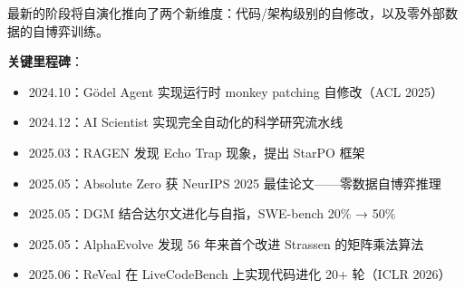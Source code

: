 最新的阶段将自演化推向了两个新维度：代码/架构级别的自修改，以及零外部数据的自博弈训练。

\textbf{关键里程碑}：
\begin{itemize}
\item 2024.10：Gödel Agent 实现运行时 monkey patching 自修改（ACL 2025）
\item 2024.12：AI Scientist 实现完全自动化的科学研究流水线
\item 2025.03：RAGEN 发现 Echo Trap 现象，提出 StarPO 框架
\item 2025.05：Absolute Zero 获 NeurIPS 2025 最佳论文——零数据自博弈推理
\item 2025.05：DGM 结合达尔文进化与自指，SWE-bench 20\% → 50\%
\item 2025.05：AlphaEvolve 发现 56 年来首个改进 Strassen 的矩阵乘法算法
\item 2025.06：ReVeal 在 LiveCodeBench 上实现代码进化 20+ 轮（ICLR 2026）
\end{itemize}

